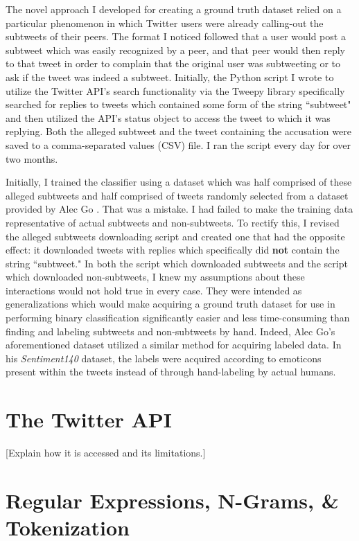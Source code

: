 \documentclass[11pt, twoside, reqno]{book}
\begin{document}
The novel approach I developed for creating a ground truth dataset relied on a particular phenomenon in which Twitter users were already calling-out the subtweets of their peers. The format I noticed followed that a user would post a subtweet which was easily recognized by a peer, and that peer would then reply to that tweet in order to complain that the original user was subtweeting or to ask if the tweet was indeed a subtweet. Initially, the Python script I wrote to utilize the Twitter API's search functionality via the Tweepy library specifically searched for replies to tweets which contained some form of the string ``subtweet" and then utilized the API's status object to access the tweet to which it was replying. Both the alleged subtweet and the tweet containing the accusation were saved to a comma-separated values (CSV) file. I ran the script every day for over two months.

Initially, I trained the classifier using a dataset which was half comprised of these alleged subtweets and half comprised of tweets randomly selected from a dataset provided by Alec Go \cite{go_dataset}. That was a mistake. I had failed to make the training data representative of actual subtweets and non-subtweets. To rectify this, I revised the alleged subtweets downloading script and created one that had the opposite effect: it downloaded tweets with replies which specifically did \textbf{not} contain the string ``subtweet." In both the script which downloaded subtweets and the script which downloaded non-subtweets, I knew my assumptions about these interactions would not hold true in every case. They were intended as generalizations which would make acquiring a ground truth dataset for use in performing binary classification significantly easier and less time-consuming than finding and labeling subtweets and non-subtweets by hand. Indeed, Alec Go's aforementioned dataset utilized a similar method for acquiring labeled data. In his \textit{Sentiment140} dataset, the labels were acquired according to emoticons present within the tweets instead of through hand-labeling by actual humans. 

\section{The Twitter API}
\label{twitter_api}

[Explain how it is accessed and its limitations.]

\section{Regular Expressions, N-Grams, \& Tokenization}
\label{regular_expressions_etc}
\end{document}
